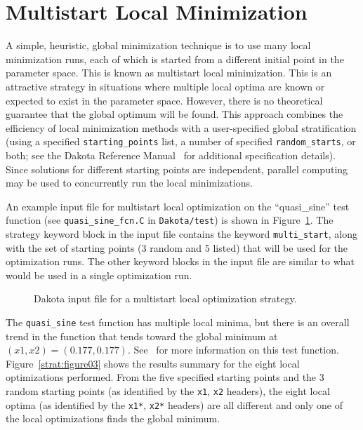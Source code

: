 \section{Multistart Local Minimization}\label{strat:multistart}

A simple, heuristic, global minimization technique is to use many
local minimization runs, each of which is started from a different
initial point in the parameter space. This is known as multistart
local minimization. This is an attractive strategy in situations where
multiple local optima are known or expected to exist in the parameter
space. However, there is no theoretical guarantee that the global
optimum will be found. This approach combines the efficiency of local
minimization methods with a user-specified global stratification
(using a specified \texttt{starting\_points} list, a number of
specified \texttt{random\_starts}, or both; see the Dakota Reference
Manual~\cite{RefMan} for additional specification details). Since
solutions for different starting points are independent, parallel
computing may be used to concurrently run the local minimizations.

An example input file for multistart local optimization on the
``quasi\_sine'' test function (see \texttt{quasi\_sine\_fcn.C} in
\texttt{Dakota/test}) is shown in Figure~\ref{strat:figure02}. The
strategy keyword block in the input file contains the keyword
\texttt{multi\_start}, along with the set of starting points (3 random 
and 5 listed) that will be used for the optimization runs. The other
keyword blocks in the input file are similar to what would be used in
a single optimization run.

\begin{figure}
  \centering
  \begin{bigbox}
    \begin{small}
    \end{small}
  \end{bigbox}
  \caption{Dakota input file for a multistart local optimization strategy.}
  \label{strat:figure02}
\end{figure}

The \texttt{quasi\_sine} test function has multiple local minima, but
there is an overall trend in the function that tends toward the global
minimum at $(x1,x2)=(0.177,0.177)$. See~\cite{Giu00} for more
information on this test function. Figure~\ref{strat:figure03} shows
the results summary for the eight local optimizations performed. From
the five specified starting points and the 3 random starting points
(as identified by the \texttt{x1}, \texttt{x2} headers), the eight
local optima (as identified by the \texttt{x1*},
\texttt{x2*} headers) are all different and only one of the local
optimizations finds the global minimum.

